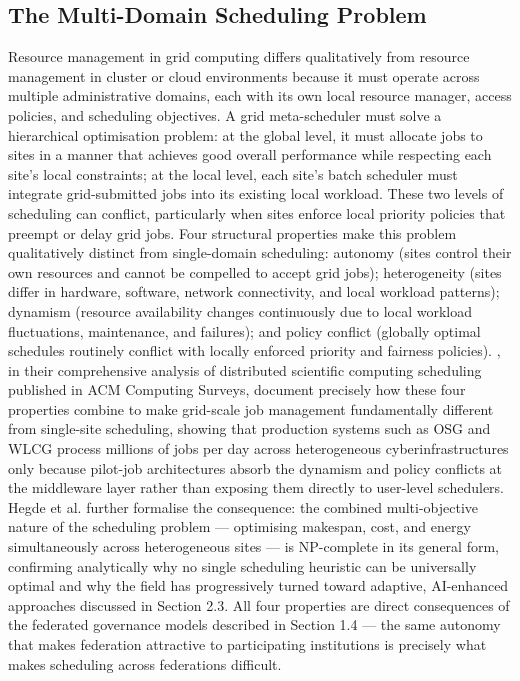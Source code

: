\documentclass[12pt,a4paper]{report}
\begin{document}
    \subsection*{The Multi-Domain Scheduling Problem}
  Resource management in grid computing differs qualitatively from resource management in cluster or cloud environments because it
   must operate across multiple administrative domains, each with its own local resource manager, access policies, and scheduling 
   objectives. A grid meta-scheduler must solve a hierarchical optimisation problem: at the global level, it must allocate jobs to
    sites in a manner that achieves good overall performance while respecting each site’s local constraints; at the local level,
     each site’s batch scheduler must integrate grid-submitted jobs into its existing local workload. These two levels of scheduling 
     can conflict, particularly when sites enforce local priority policies that preempt or delay grid jobs. Four structural properties
      make this problem qualitatively distinct from single-domain scheduling: autonomy (sites control their own resources and cannot be 
      compelled to accept grid jobs); heterogeneity (sites differ in hardware, software, network connectivity, and local workload patterns); 
      dynamism (resource availability changes continuously due to local workload fluctuations, maintenance, and failures); and policy conflict 
      (globally optimal schedules routinely conflict with locally enforced priority and fairness policies). \parencite{turilli2018pilot}, 
      in their comprehensive analysis of distributed scientific computing scheduling published in ACM Computing Surveys, document precisely how
       these four properties combine to make grid-scale job management fundamentally different from single-site scheduling, showing that production
        systems such as OSG and WLCG process millions of jobs per day across heterogeneous cyberinfrastructures only because pilot-job architectures 
        absorb the dynamism and policy conflicts at the middleware layer rather than exposing them directly to user-level schedulers. 
        Hegde et al. \parencite{hegde2024} further formalise the consequence: the combined multi-objective nature of the scheduling problem — optimising makespan, 
        cost, and energy simultaneously across heterogeneous sites — is NP-complete in its general form, confirming analytically why no single 
        scheduling heuristic can be universally optimal and why the field has progressively turned toward adaptive, AI-enhanced approaches 
        discussed in Section 2.3. All four properties are direct consequences of the federated governance models described in 
        Section 1.4 — the same autonomy that makes federation attractive to participating institutions is precisely what makes scheduling
         across federations difficult.
\end{document}
